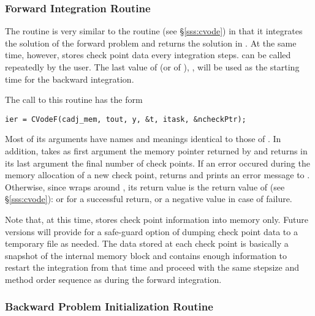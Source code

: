 \subsubsection{Forward Integration Routine}\label{sss:cvodef}

The routine  is very similar to the {\cvodes} routine 
(see \S\ref{sss:cvode}) in that it integrates the solution of the forward
problem and returns the solution in . At the same time,
however,  stores check point data every  integration steps.
 can be called repeatedly by the user. The last value of  
(or of ), , will be used as the starting time for the backward 
integration.

The call to this routine has the form
\begin{verbatim}
ier = CVodeF(cadj_mem, tout, y, &t, itask, &ncheckPtr);
\end{verbatim}
Most of its arguments have names and meanings identical to those of .
In addition,  takes as first argument the memory pointer 
returned by  and returns in its last argument the final number of 
check points. If an error occured during the memory allocation of a new check
point,  returns  and prints an error message to 
. Otherwise, since  wraps around , its return 
value  is the return value of  (see \S\ref{sss:cvode}): 
 or  for a successful return, 
or a negative value in case of failure.

Note that, at this time,  stores check point information into memory
only. Future versions will provide for a safe-guard option of dumping check point
data to a temporary file as needed. The data stored at each check point is basically
a snapshot of the {\cvodes} internal memory block and contains enough information
to restart the integration from that time and proceed with the same stepsize and
method order sequence as during the forward integration.

\subsubsection{Backward Problem Initialization Routine}\label{sss:cvodemallocb}


